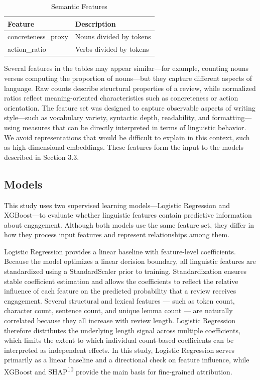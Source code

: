 \documentclass[12pt]{article}
\begin{document}
\begin{longtable}{ll}
\caption{Semantic Features} \\
\textbf{Feature} & \textbf{Description} \\
\hline
concreteness\_proxy & Nouns divided by tokens \\
action\_ratio & Verbs divided by tokens \\
\end{longtable}

Several features in the tables may appear similar—for example, counting nouns versus computing the proportion of nouns—but they capture different aspects of language. Raw counts describe structural properties of a review, while normalized ratios reflect meaning-oriented characteristics such as concreteness or action orientation. The feature set was designed to capture observable aspects of writing style—such as vocabulary variety, syntactic depth, readability, and formatting—using measures that can be directly interpreted in terms of linguistic behavior. We avoid representations that would be difficult to explain in this context, such as high-dimensional embeddings. These features form the input to the models described in Section 3.3.

\subsection{Models}

This study uses two supervised learning models—Logistic Regression and XGBoost—to evaluate whether linguistic features contain predictive information about engagement. Although both models use the same feature set, they differ in how they process input features and represent relationships among them.

Logistic Regression provides a linear baseline with feature-level coefficients. Because the model optimizes a linear decision boundary, all linguistic features are standardized using a StandardScaler prior to training. Standardization ensures stable coefficient estimation and allows the coefficients to reflect the relative influence of each feature on the predicted probability that a review receives engagement.
Several structural and lexical features — such as token count, character count, sentence count, and unique lemma count — are naturally correlated because they all increase with review length. Logistic Regression therefore distributes the underlying length signal across multiple coefficients, which limits the extent to which individual count-based coefficients can be interpreted as independent effects. In this study, Logistic Regression serves primarily as a linear baseline and a directional check on feature influence, while XGBoost and SHAP\textsuperscript{10} 
provide the main basis for fine-grained attribution.
\end{document}
